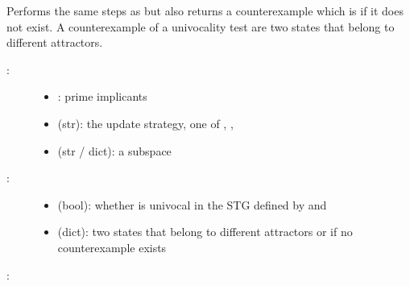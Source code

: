 \documentclass[letterpaper,10pt,english]{sphinxmanual}
\begin{document}
\begin{fulllineitems}
\label{\detokenize{AttractorDetection:PyBoolNet.AttractorDetection.univocality_with_counterexample}}
Performs the same steps as {\hyperref[\detokenize{AttractorDetection:univocality}]{}} but also returns a counterexample which is  if it does not exist.
A counterexample of a univocality test are two states that belong to different attractors.
\begin{description}
\item[{:}] \leavevmode\begin{itemize}
\item {} 
: prime implicants

\item {} 
 (str): the update strategy, one of , , 

\item {} 
 (str / dict): a subspace

\end{itemize}

\item[{:}] \leavevmode\begin{itemize}
\item {} 
 (bool): whether  is univocal in the STG defined by  and 

\item {} 
 (dict): two states that belong to different attractors or  if no counterexample exists

\end{itemize}

\end{description}

:

\begin{sphinxVerbatim}[commandchars=\\\{\}]
   
  \PYG{p}{[}\PYG{p}{]}
     
\end{sphinxVerbatim}

\end{fulllineitems}
\end{document}
